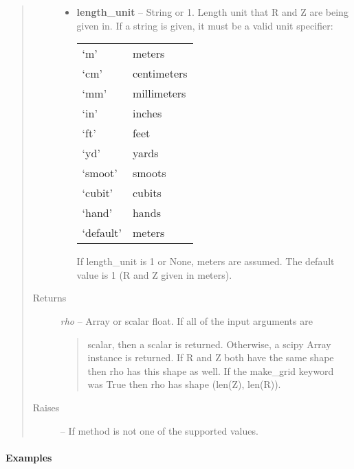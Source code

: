 \documentclass[letterpaper,10pt,english]{sphinxmanual}
\begin{document}
\begin{fulllineitems}
\begin{fulllineitems}
\begin{quote}
\begin{description}
\begin{itemize}
\item {} 
\textbf{length\_unit} --
String or 1.
Length unit that R and Z are being given
in. If a string is given, it must be a valid unit specifier:

\begin{tabulary}{\linewidth}{|L|L|}
\hline

`m'
 & 
meters
\\

`cm'
 & 
centimeters
\\

`mm'
 & 
millimeters
\\

`in'
 & 
inches
\\

`ft'
 & 
feet
\\

`yd'
 & 
yards
\\

`smoot'
 & 
smoots
\\

`cubit'
 & 
cubits
\\

`hand'
 & 
hands
\\

`default'
 & 
meters
\\
\hline\end{tabulary}


If length\_unit is 1 or None, meters are assumed. The default
value is 1 (R and Z given in meters).

\end{itemize}

\item[{Returns}] \leavevmode

\emph{rho} --
Array or scalar float. If all of the input arguments are
\begin{quote}

scalar, then a scalar is returned. Otherwise, a scipy Array
instance is returned. If R and Z both have the same shape then
rho has this shape as well. If the make\_grid keyword was True
then rho has shape (len(Z), len(R)).
\end{quote}


\item[{Raises}] \leavevmode
{} -- 
If method is not one of the supported values.

\end{description}\end{quote}
\paragraph{Examples}


\end{fulllineitems}
\end{fulllineitems}
\end{document}
